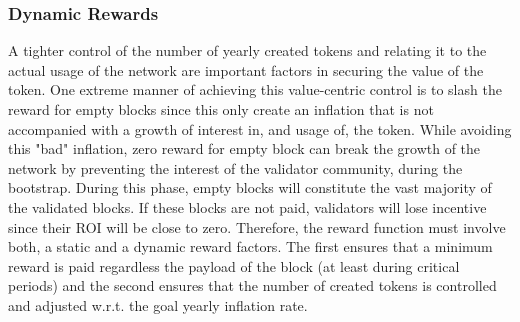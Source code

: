 \subsubsection{Dynamic Rewards} A tighter control of the number of yearly created tokens and relating it to the actual usage of the network are important factors in securing the value of the token. One extreme manner of achieving this value-centric control is to slash the reward for empty blocks since this only create an inflation that is not accompanied with a growth of interest in, and usage of, the token. While avoiding this "bad" inflation, zero reward for empty block can break the growth of the network by preventing the interest of the validator community, during the bootstrap. During this phase, empty blocks will constitute the vast majority of the validated blocks. If these blocks are not paid, validators will lose incentive since their ROI will be close to zero. Therefore, the reward function must involve both, a static and a dynamic reward factors. The first ensures that a minimum reward is paid regardless the payload of the block (at least during critical periods) and the second ensures that the number of created tokens is controlled and adjusted w.r.t. the goal yearly inflation rate.  
